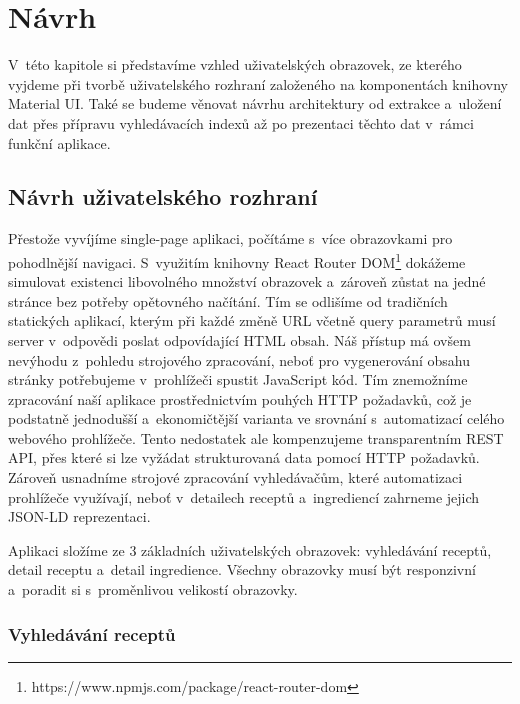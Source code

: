 
\chapter{Návrh}

V~této kapitole si představíme vzhled uživatelských obrazovek, ze kterého vyjdeme při tvorbě uživatelského rozhraní založeného na komponentách knihovny Material UI. Také se budeme věnovat návrhu architektury od extrakce a~uložení dat přes přípravu vyhledávacích indexů až po prezentaci těchto dat v~rámci funkční aplikace.

\section{Návrh uživatelského rozhraní}

Přestože vyvíjíme single-page aplikaci, počítáme s~více obrazovkami pro pohodlnější navigaci. S~využitím knihovny React Router DOM\footnote{https://www.npmjs.com/package/react-router-dom} dokážeme simulovat existenci libovolného množství obrazovek a~zároveň zůstat na jedné stránce bez potřeby opětovného načítání. Tím se odlišíme od tradičních statických aplikací, kterým při každé změně URL včetně query parametrů musí server v~odpovědi poslat odpovídající HTML obsah. Náš přístup má ovšem nevýhodu z~pohledu strojového zpracování, neboť pro vygenerování obsahu stránky potřebujeme v~prohlížeči spustit JavaScript kód. Tím znemožníme zpracování naší aplikace prostřednictvím pouhých HTTP požadavků, což je podstatně jednodušší a~ekonomičtější varianta ve srovnání s~automatizací celého webového prohlížeče. Tento nedostatek ale kompenzujeme transparentním REST API, přes které si lze vyžádat strukturovaná data pomocí HTTP požadavků. Zároveň usnadníme strojové zpracování vyhledávačům, které automatizaci prohlížeče využívají, neboť v~detailech receptů a~ingrediencí zahrneme jejich JSON-LD reprezentaci.

Aplikaci složíme ze $3$ základních uživatelských obrazovek: vyhledávání receptů, detail receptu a~detail ingredience. Všechny obrazovky musí být responzivní a~poradit si s~proměnlivou velikostí obrazovky.

\subsection{Vyhledávání receptů}

